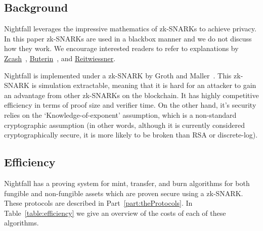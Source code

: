 \subsection{Background}
Nightfall leverages the impressive mathematics of zk-SNARKs to achieve privacy.
In this paper zk-SNARKs are used in a blackbox manner and we do not discuss how they work.
We encourage interested readers to refer to explanations by
\href{https://z.cash/technology/zksnarks/}{Zcash}~\cite{whatAreSNARKs},
\href{https://medium.com/@VitalikButerin/zk-snarks-under-the-hood-b33151a013f6}{Buterin}~\cite{underTheHood},
and \href{https://blog.ethereum.org/2016/12/05/zksnarks-in-a-nutshell/}{Reitwiessner}\cite{zkSNARKsNutshell}.

Nightfall is implemented under a zk-SNARK by Groth and Maller~\cite{DBLP:conf/crypto/GrothM17}.
This zk-SNARK is simulation extractable, meaning that it is hard for an attacker to gain an advantage from other zk-SNARKs on the blockchain.
It has highly competitive efficiency in terms of proof size and verifier time.
On the other hand, it's security relies on the `Knowledge-of-exponent' assumption, which is a non-standard cryptographic assumption (in other words, although it is currently considered cryptographically secure, it is more likely to be broken than RSA or discrete-log).

\subsection{Efficiency}
Nightfall has a proving system for mint, transfer, and burn algorithms for both fungible and non-fungible assets which are proven secure using a zk-SNARK.
These protocols are described in Part~\ref{part:theProtocols}.
In Table~\ref{table:efficiency} we give an overview of the costs of each of these algorithms.

